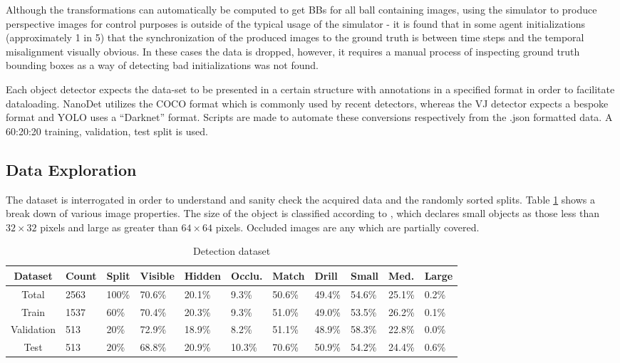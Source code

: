 \documentclass[a4paper,twoside,12pt]{report}
\begin{document}
Although the transformations can automatically be computed to get BBs for all ball containing images, using the simulator to produce perspective images for control purposes is outside of the typical usage of the simulator - it is found that in some agent initializations (approximately 1 in 5) that the synchronization of the produced images to the ground truth is between time steps and the temporal misalignment visually obvious. In these cases the data is dropped, however, it requires a manual process of inspecting ground truth bounding boxes as a way of detecting bad initializations was not found.

Each object detector expects the data-set to be presented in a certain structure with annotations in a specified format in order to facilitate dataloading. NanoDet utilizes the COCO format \citep{cocodataset} which is commonly used by recent detectors, whereas the VJ detector expects a bespoke format \citep{vjdataset} and YOLO uses a ``Darknet'' format. Scripts are made to automate these conversions respectively from the .json formatted data. A 60:20:20 training, validation, test split is used.

\subsection{Data Exploration}
The dataset is interrogated in order to understand and sanity check the acquired data and the randomly sorted splits. Table \ref{tab:detection} shows a break down of various image properties. The size of the object is classified according to \cite{cocoeval}, which declares small objects as those less than $32\times32$ pixels and large as greater than $64\times64$ pixels. Occluded images are any which are partially covered.

\begin{table}[h!]
\fontsize{9.5pt}{12pt}\selectfont
\centering
\begin{tabular}{c|ll|lll|ll|lll}
{\bf Dataset}	&{\bf Count}	&{\bf Split}	&{\bf Visible}	&{\bf Hidden}	&{\bf Occlu.}	&{\bf Match}	&{\bf Drill}	&{\bf Small}	&{\bf Med.}	&{\bf Large}	\\\hline
Total			&2563			&100\%			&70.6\%			&20.1\%			&9.3\%			&50.6\%			&49.4\%			&54.6\%			&25.1\%			&0.2\%			\\\hline   
Train			&1537			&60\%			&70.4\%			&20.3\%			&9.3\%			&51.0\%			&49.0\%			&53.5\%			&26.2\%			&0.1\%			\\\hline  
Validation		&513			&20\%			&72.9\%			&18.9\%			&8.2\%			&51.1\%			&48.9\%			&58.3\%			&22.8\%			&0.0\%			\\\hline  
Test			&513			&20\%			&68.8\%			&20.9\%			&10.3\%			&70.6\%			&50.9\%			&54.2\%			&24.4\%			&0.6\%			\\\hline                        
\end{tabular}
\caption{Detection dataset}
\label{tab:detection}
\end{table}
\end{document}
